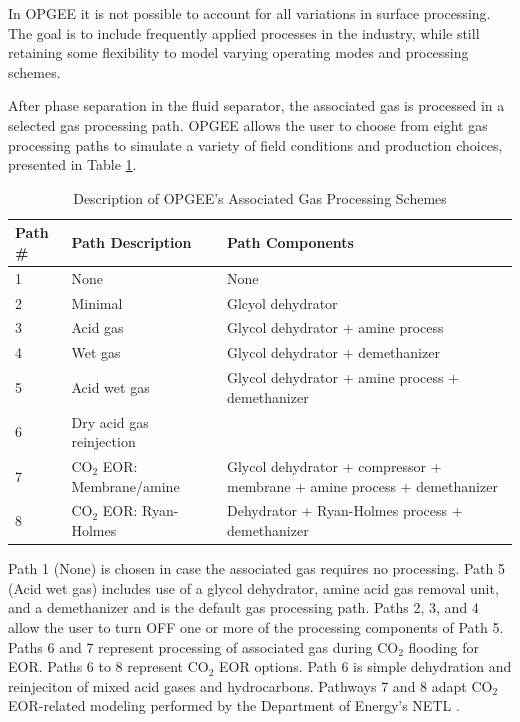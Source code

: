 \documentclass[11pt]{report}
\begin{document}
{In OPGEE it is not possible to account for all variations in surface processing. The goal is to include frequently applied processes in the industry, while still retaining some flexibility to model varying operating modes and processing schemes.

After phase separation in the fluid separator, the associated gas is processed in a selected gas processing path. OPGEE allows the user to choose from eight gas processing paths to simulate a variety of field conditions and production choices, presented in Table \ref{tab:GasProcessingSchemes}. 

\begin{table}
\begin{scriptsize}
\caption{Description of OPGEE's Associated Gas Processing Schemes}
\label{tab:GasProcessingSchemes}
\begin{tabularx}{1\columnwidth}{p{}p{}p{}}
\toprule
Path \# & Path Description & Path Components \\
\midrule
1 & None & None \\
2 & Minimal & Glcyol dehydrator \\
3 & Acid gas & Glycol dehydrator + amine process \\
4 & Wet gas & Glycol dehydrator + demethanizer \\
5 & Acid wet gas & Glycol dehydrator + amine process + demethanizer  \\
6 & Dry acid gas reinjection \\
7 & CO$_{2}$ EOR: Membrane/amine & Glycol dehydrator + compressor + membrane + amine process + demethanizer \\
8 & CO$_{2}$ EOR: Ryan-Holmes & Dehydrator + Ryan-Holmes process + demethanizer  \\
\bottomrule
\end{tabularx}
\end{scriptsize}
\end{table}

Path 1 (None) is chosen in case the associated gas requires no processing. Path 5 (Acid wet gas) includes use of a glycol dehydrator, amine acid gas removal unit, and a demethanizer and is the default gas processing path. Paths 2, 3, and 4 allow the user to turn OFF one or more of the processing components of Path 5. Paths 6 and 7 represent processing of associated gas during CO$_2$ flooding for EOR. Paths 6 to 8 represent CO$_2$ EOR options. Path 6 is simple dehydration and reinjeciton of mixed acid gases and hydrocarbons. Pathways 7 and 8 adapt CO$_2$ EOR-related modeling performed by the Department of Energy's NETL \cite{NETL2013,NETLChillerModel,NETLMembraneModel,NETLRyanHolmesModel}. 

}
\end{document}
